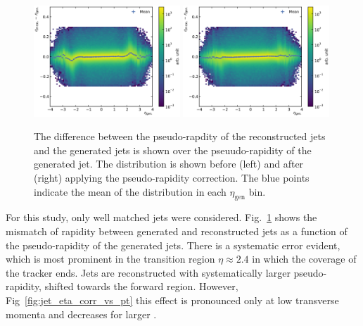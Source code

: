 \begin{figure}[htbp]
    \centering
    \includegraphics[width=0.49\textwidth]{figures/measurement/genvsreco_eta.pdf}\hfill
    \includegraphics[width=0.49\textwidth]{figures/measurement/genvsreco_eta_corr.pdf}
    \caption[Differences of pseudo-rapidity of reconstructed jets to
        generator-level jets]{The difference between the pseudo-rapdity of the
            reconstructed jets and the generated jets is shown over the
            pseuudo-rapidity of the generated jet. The distribution is shown
            before (left) and after (right) applying the pseudo-rapidity
            correction. The blue points indicate the mean of the distribution in
            each $\eta_{\mathrm{gen}}$ bin.}
    \label{fig:jet_eta_corr}
\end{figure}

For this study, only well matched jets were considered.
Fig.~\ref{fig:jet_eta_corr} shows the mismatch of rapidity between generated and
reconstructed jets as a function of the pseudo-rapidity of the generated jets.
There is a systematic error evident, which is most prominent in the transition
region $\eta \approx 2.4$ in which the coverage of the tracker ends. Jets are
reconstructed with systematically larger pseudo-rapidity, \ie shifted towards
the forward region. However, Fig~\ref{fig:jet_eta_corr_vs_pt} this effect is
pronounced only at low transverse momenta and decreases for larger \pt. 

